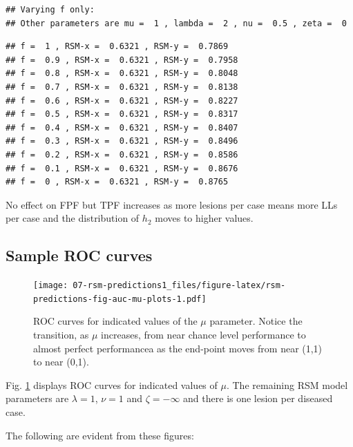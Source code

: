 \documentclass[
]{book}
\begin{document}
\begin{verbatim}
## Varying f only: 
## Other parameters are mu =  1 , lambda =  2 , nu =  0.5 , zeta =  0
\end{verbatim}

\begin{verbatim}
## f =  1 , RSM-x =  0.6321 , RSM-y =  0.7869 
## f =  0.9 , RSM-x =  0.6321 , RSM-y =  0.7958 
## f =  0.8 , RSM-x =  0.6321 , RSM-y =  0.8048 
## f =  0.7 , RSM-x =  0.6321 , RSM-y =  0.8138 
## f =  0.6 , RSM-x =  0.6321 , RSM-y =  0.8227 
## f =  0.5 , RSM-x =  0.6321 , RSM-y =  0.8317 
## f =  0.4 , RSM-x =  0.6321 , RSM-y =  0.8407 
## f =  0.3 , RSM-x =  0.6321 , RSM-y =  0.8496 
## f =  0.2 , RSM-x =  0.6321 , RSM-y =  0.8586 
## f =  0.1 , RSM-x =  0.6321 , RSM-y =  0.8676 
## f =  0 , RSM-x =  0.6321 , RSM-y =  0.8765
\end{verbatim}

No effect on FPF but TPF increases as more lesions per case means more LLs per case and the distribution of \(h_2\) moves to higher values.

\hypertarget{rsm-predictions-roc-curves}{%
\subsection{Sample ROC curves}\label{rsm-predictions-roc-curves}}

\begin{figure}
\centering
\texttt{[image: 07-rsm-predictions1\_files/figure-latex/rsm-predictions-fig-auc-mu-plots-1.pdf]}
\caption{\label{fig:rsm-predictions-fig-auc-mu-plots}ROC curves for indicated values of the \(\mu\) parameter. Notice the transition, as \(\mu\) increases, from near chance level performance to almost perfect performancea as the end-point moves from near (1,1) to near (0,1).}
\end{figure}

Fig. \ref{fig:rsm-predictions-fig-auc-mu-plots} displays ROC curves for indicated values of \(\mu\). The remaining RSM model parameters are \(\lambda = 1\), \(\nu = 1\) and \(\zeta = -\infty\) and there is one lesion per diseased case.

The following are evident from these figures:
\end{document}
